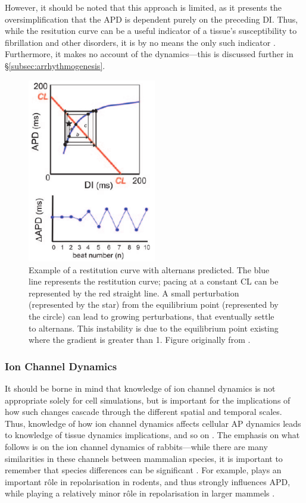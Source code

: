 \documentclass[../thesis-main.tex]{subfiles}
\begin{document}
 However, it should be noted that this approach is limited, as it presents the oversimplification that the APD is dependent purely on the preceding DI. Thus, while the resitution curve can be a useful indicator of a tissue's susceptibility to fibrillation and other disorders, it is by no means the only such indicator \citep{Riccio1999}. Furthermore, it makes no account of the \cai{} dynamics---this is discussed further in \S\ref{subsec:arrhythmogenesis}.
 \begin{figure}
  \centering
  \includegraphics[width=0.5\textwidth]{alternans-restitutionCurve}
  \caption[Example of a restitution curve with alternans predicted]{Example of a restitution curve with alternans predicted. The blue line represents the restitution curve; pacing at a constant CL can be represented by the red straight line. A small perturbation (represented by the star) from the equilibrium point (represented by the circle) can lead to growing perturbations, that eventually settle to alternans. This instability is due to the equilibrium point existing where the gradient is greater than 1. Figure originally from \citet{Weiss2006}.}
  \label{fig:alternans-restitutionCurve}
 \end{figure}
 
 \subsubsection{Ion Channel Dynamics}
 \label{subsubsec:channel-dynamics}
 It should be borne in mind that knowledge of ion channel dynamics is not appropriate solely for cell simulations, but is important for the implications of how such changes cascade through the different spatial and temporal scales. Thus, knowledge of how ion channel dynamics affects cellular AP dynamics leads to knowledge of tissue dynamics implications, and so on \citep{Spach1988}. The emphasis on what follows is on the ion channel dynamics of rabbits---while there are many similarities in these channels between mammalian species, it is important to remember that species differences can be significant \citep{Bassani1994}. For example, \ito{} plays an important r\^ole in repolarisation in rodents, and thus strongly influences APD, while playing a relatively minor r\^ole in repolarisation in larger mammels \citep{Rosati2004}.
 
\end{document}
